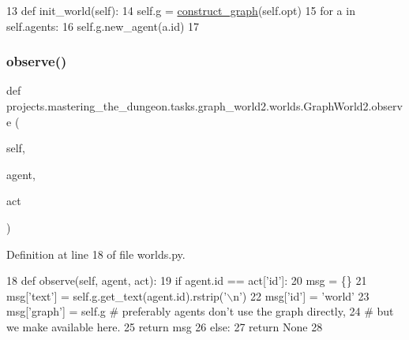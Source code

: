 \begin{DoxyCode}
13     \textcolor{keyword}{def }init\_world(self):
14         self.g = \hyperlink{namespaceprojects_1_1mastering__the__dungeon_1_1tasks_1_1graph__world2_1_1graph_a5cd70dc74f0447a0dda626d8c524b4c9}{construct\_graph}(self.opt)
15         \textcolor{keywordflow}{for} a \textcolor{keywordflow}{in} self.agents:
16             self.g.new\_agent(a.id)
17 
\end{DoxyCode}
\mbox{\label{classprojects_1_1mastering__the__dungeon_1_1tasks_1_1graph__world2_1_1worlds_1_1GraphWorld2_a3a97aa60f79764ae4525cc4df85180e5}} 
\subsubsection{\texorpdfstring{observe()}{observe()}}
{\footnotesize\ttfamily def projects.\+mastering\+\_\+the\+\_\+dungeon.\+tasks.\+graph\+\_\+world2.\+worlds.\+Graph\+World2.\+observe (\begin{DoxyParamCaption}\item[{}]{self,  }\item[{}]{agent,  }\item[{}]{act }\end{DoxyParamCaption})}



Definition at line 18 of file worlds.\+py.


\begin{DoxyCode}
18     \textcolor{keyword}{def }observe(self, agent, act):
19         \textcolor{keywordflow}{if} agent.id == act[\textcolor{stringliteral}{'id'}]:
20             msg = \{\}
21             msg[\textcolor{stringliteral}{'text'}] = self.g.get\_text(agent.id).rstrip(\textcolor{stringliteral}{'\(\backslash\)n'})
22             msg[\textcolor{stringliteral}{'id'}] = \textcolor{stringliteral}{'world'}
23             msg[\textcolor{stringliteral}{'graph'}] = self.g  \textcolor{comment}{# preferably agents don't use the graph directly,}
24             \textcolor{comment}{# but we make available here.}
25             \textcolor{keywordflow}{return} msg
26         \textcolor{keywordflow}{else}:
27             \textcolor{keywordflow}{return} \textcolor{keywordtype}{None}
28 
\end{DoxyCode}


